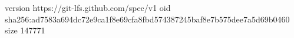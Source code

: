version https://git-lfs.github.com/spec/v1
oid sha256:ad7583a694dc72e9ca1f8e69cfa8fbd574387245baf8e7b575dee7a5d69b0460
size 147771
